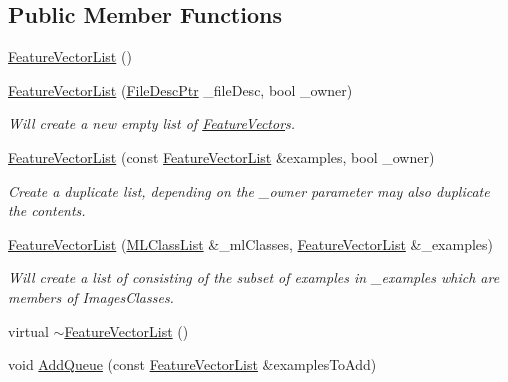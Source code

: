 \subsection*{Public Member Functions}
\begin{DoxyCompactItemize}
\item 
\hyperlink{class_k_k_m_l_l_1_1_feature_vector_list_a102284896708eb82b5879dcf9a92e974}{Feature\+Vector\+List} ()
\item 
\hyperlink{class_k_k_m_l_l_1_1_feature_vector_list_ac8845e73b20de4c9fac69d494fcf6678}{Feature\+Vector\+List} (\hyperlink{namespace_k_k_m_l_l_aa0d0b6ab4ec18868a399b8455b05d914}{File\+Desc\+Ptr} \+\_\+file\+Desc, bool \+\_\+owner)
\begin{DoxyCompactList}\small\item\em Will create a new empty list of \hyperlink{class_k_k_m_l_l_1_1_feature_vector}{Feature\+Vector}\textquotesingle{}s. \end{DoxyCompactList}\item 
\hyperlink{class_k_k_m_l_l_1_1_feature_vector_list_a0b01f5191bfa56809c1c3b4c83fe1801}{Feature\+Vector\+List} (const \hyperlink{class_k_k_m_l_l_1_1_feature_vector_list}{Feature\+Vector\+List} \&examples, bool \+\_\+owner)
\begin{DoxyCompactList}\small\item\em Create a duplicate list, depending on the \textquotesingle{}\+\_\+owner\textquotesingle{} parameter may also duplicate the contents. \end{DoxyCompactList}\item 
\hyperlink{class_k_k_m_l_l_1_1_feature_vector_list_af5043f741bb3799c24c2efaac4ec9db6}{Feature\+Vector\+List} (\hyperlink{class_k_k_m_l_l_1_1_m_l_class_list}{M\+L\+Class\+List} \&\+\_\+ml\+Classes, \hyperlink{class_k_k_m_l_l_1_1_feature_vector_list}{Feature\+Vector\+List} \&\+\_\+examples)
\begin{DoxyCompactList}\small\item\em Will create a list of consisting of the subset of examples in \textquotesingle{}\+\_\+examples\textquotesingle{} which are members of Images\+Classes. \end{DoxyCompactList}\item 
virtual \hyperlink{class_k_k_m_l_l_1_1_feature_vector_list_a588f2ca2b19664a70fbb02a29d3c418f}{$\sim$\+Feature\+Vector\+List} ()
\item 
void \hyperlink{class_k_k_m_l_l_1_1_feature_vector_list_a90809e07f7e33e591da0d266c1907ca9}{Add\+Queue} (const \hyperlink{class_k_k_m_l_l_1_1_feature_vector_list}{Feature\+Vector\+List} \&examples\+To\+Add)

\end{DoxyCompactItemize}
